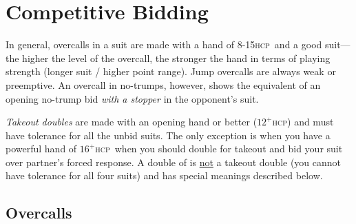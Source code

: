 \documentclass[a4paper,article,oneside]{memoir}
\newcommand{\hcp}{\textsc{hcp}}
\begin{document}
\pagebreak

\section{Competitive Bidding}

In general, overcalls in a suit are made with a hand of 8-15\hcp\ and
a good suit---the higher the level of the overcall, the stronger the
hand in terms of playing strength (longer suit / higher point
range). Jump overcalls are always weak or preemptive. An overcall in
no-trumps, however, shows the equivalent of an opening no-trump bid
\emph{with a stopper} in the opponent's suit.

\emph{Takeout doubles} are made with an opening hand or better
($12^+$\hcp) and must have tolerance for all the unbid suits. The only
exception is when you have a powerful hand of $16^+$\hcp\ when you
should double for takeout and bid your suit over partner's forced
response. A double of  is \underline{not} a takeout double (you
cannot have tolerance for all four suits) and has special meanings
described below.

\subsection{Overcalls}
\end{document}
